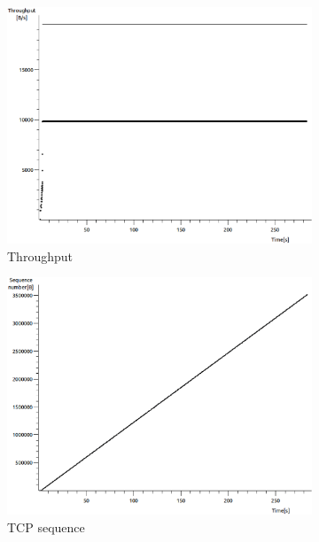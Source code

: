 \documentclass[conference,a4paper]{../../sty/IEEEtran}
\begin{document}
\begin{figure}
 \centering
 \begin{subfigure}[b]{0.2\textwidth}
  \includegraphics[width=\textwidth]{s1-2_thru}
  \caption{Throughput}
 \end{subfigure}
 \begin{subfigure}[b]{0.2\textwidth}
  \includegraphics[width=\textwidth]{s1-2_seq}
  \caption{TCP sequence}
 \end{subfigure}
 \begin{subfigure}[b]{0.2\textwidth}

\end{subfigure}
\end{figure}
\end{document}
